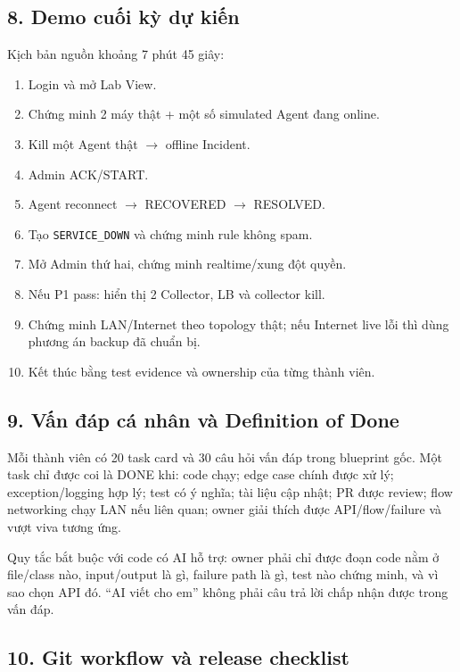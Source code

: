 \subsection*{8. Demo cuối kỳ dự kiến}

Kịch bản nguồn khoảng 7 phút 45 giây:
\begin{enumerate}
    \item Login và mở Lab View.
    \item Chứng minh 2 máy thật + một số simulated Agent đang online.
    \item Kill một Agent thật $\rightarrow$ offline Incident.
    \item Admin ACK/START.
    \item Agent reconnect $\rightarrow$ RECOVERED $\rightarrow$ RESOLVED.
    \item Tạo \texttt{SERVICE\_DOWN} và chứng minh rule không spam.
    \item Mở Admin thứ hai, chứng minh realtime/xung đột quyền.
    \item Nếu P1 pass: hiển thị 2 Collector, LB và collector kill.
    \item Chứng minh LAN/Internet theo topology thật; nếu Internet live lỗi thì dùng phương án backup đã chuẩn bị.
    \item Kết thúc bằng test evidence và ownership của từng thành viên.
\end{enumerate}

\subsection*{9. Vấn đáp cá nhân và Definition of Done}

Mỗi thành viên có 20 task card và 30 câu hỏi vấn đáp trong blueprint gốc. Một task chỉ được coi là DONE khi: code chạy; edge case chính được xử lý; exception/logging hợp lý; test có ý nghĩa; tài liệu cập nhật; PR được review; flow networking chạy LAN nếu liên quan; owner giải thích được API/flow/failure và vượt viva tương ứng.

\begin{vivabox}
Quy tắc bắt buộc với code có AI hỗ trợ: owner phải chỉ được đoạn code nằm ở file/class nào, input/output là gì, failure path là gì, test nào chứng minh, và vì sao chọn API đó. ``AI viết cho em'' không phải câu trả lời chấp nhận được trong vấn đáp.
\end{vivabox}

\subsection*{10. Git workflow và release checklist}


